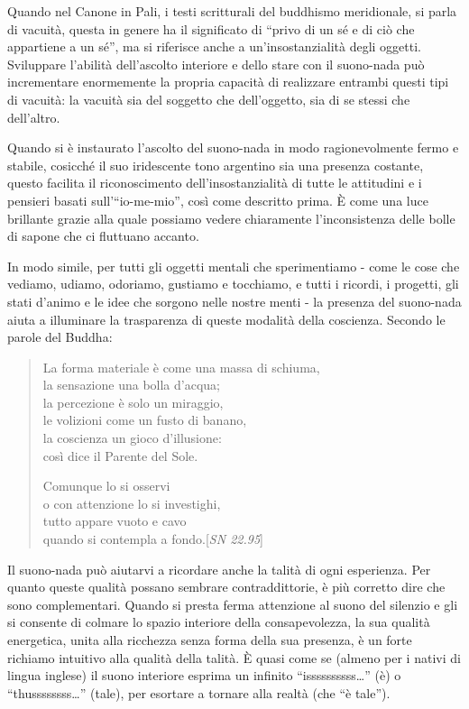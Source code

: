 Quando nel Canone in Pali, i testi scritturali del buddhismo
meridionale, si parla di vacuità, questa in genere ha il significato di
``privo di un sé e di ciò che appartiene a un sé'', ma si riferisce
anche a un'insostanzialità degli oggetti. Sviluppare l'abilità
dell'ascolto interiore e dello stare con il suono-nada può incrementare
enormemente la propria capacità di realizzare entrambi questi tipi di
vacuità: la vacuità sia del soggetto che dell'oggetto, sia di se stessi
che dell'altro.

Quando si è instaurato l'ascolto del suono-nada in modo ragionevolmente
fermo e stabile, cosicché il suo iridescente tono argentino sia una
presenza costante, questo facilita il riconoscimento
dell'insostanzialità di tutte le attitudini e i pensieri basati
sull'``io-me-mio'', così come descritto prima. È come una luce brillante
grazie alla quale possiamo vedere chiaramente l'inconsistenza delle
bolle di sapone che ci fluttuano accanto.

In modo simile, per tutti gli oggetti mentali che sperimentiamo - come
le cose che vediamo, udiamo, odoriamo, gustiamo e tocchiamo, e tutti i
ricordi, i progetti, gli stati d'animo e le idee che sorgono nelle
nostre menti - la presenza del suono-nada aiuta a illuminare la
trasparenza di queste modalità della coscienza. Secondo le parole del
Buddha:

\begin{quote}
La forma materiale è come una massa di schiuma,\\
la sensazione una bolla d'acqua;\\
la percezione è solo un miraggio,\\
le volizioni come un fusto di banano,\\
la coscienza un gioco d'illusione:\\
così dice il Parente del Sole.

Comunque lo si osservi\\
o con attenzione lo si investighi,\\
tutto appare vuoto e cavo\\
quando si contempla a fondo.\hfill [\emph{SN 22.95}]
\end{quote}

Il suono-nada può aiutarvi a ricordare anche la talità di ogni
esperienza. Per quanto queste qualità possano sembrare contraddittorie,
è più corretto dire che sono complementari. Quando si presta ferma
attenzione al suono del silenzio e gli si consente di colmare lo spazio
interiore della consapevolezza, la sua qualità energetica, unita alla
ricchezza senza forma della sua presenza, è un forte richiamo intuitivo
alla qualità della talità. È quasi come se (almeno per i nativi di
lingua inglese) il suono interiore esprima un infinito
``issssssssss\ldots{}'' (è) o ``thussssssss\ldots{}'' (tale), per
esortare a tornare alla realtà (che ``è tale'').

